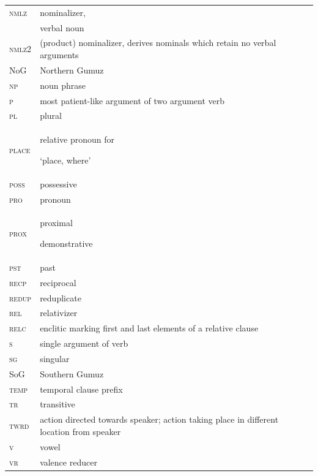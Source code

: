 \documentclass[output=paper]{langsci/langscibook}
\begin{document}
\begin{tabularx}{.45\textwidth}{lX}

\textsc{nmlz}   &  nominalizer, \\
& verbal noun \\
\textsc{nmlz2 }  &  (product) nominalizer, derives nominals which retain no verbal arguments \\


NoG  &  Northern Gumuz \\

\textsc{np}  &  noun phrase \\

\textsc{p}  &  most patient-like argument of two argument verb \\

\textsc{pl}   & plural \\

\textsc{place}  &  relative pronoun for 

‘place, where’ \\

\textsc{poss}  &  possessive \\

\textsc{pro}  &  pronoun \\

\textsc{prox}  &  proximal 

demonstrative \\

\textsc{pst}  &  past \\

\textsc{recp}  &  reciprocal \\

\textsc{redup}  &  reduplicate\\

\textsc{rel}  &  relativizer \\

\textsc{relc} & enclitic marking first and last elements of a relative clause \\

\textsc{s}  &   single argument of verb \\

\textsc{sg}  &  singular \\

SoG & Southern Gumuz \\

\textsc{temp}  &  temporal clause prefix \\

\textsc{tr}  &   transitive \\

\textsc{twrd}  & action directed towards speaker; action taking place in different location from speaker \\

\textsc{v} & vowel \\

\textsc{vr} &  valence reducer \\
\end{tabularx}
\end{document}
